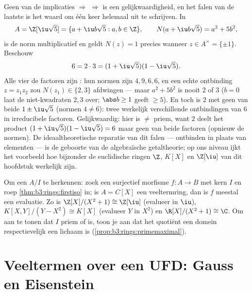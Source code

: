 \begin{example}
\label{ex:b3:rings:nonufd}
Geen van de implicaties  $\Rightarrow$
 $\Rightarrow$  is een gelijkwaardigheid, en
het falen van de laatste is het waard om één keer helemaal uit
te schrijven. In
\[
A = \Z[\iu\sqrt5] = \{a + \iu b\sqrt5 : a, b \in \Z\},
\qquad N(a + \iu b\sqrt5) = a^2 + 5b^2,
\]
is de norm multiplicatief en geldt $N(z) = 1$ precies wanneer
$z \in A^\times = \{\pm1\}$. Beschouw
\[
6 = 2 \cdot 3 = (1 + \iu\sqrt5)(1 - \iu\sqrt5).
\]
Alle vier de factoren zijn : hun normen zijn $4, 9,
6, 6$, en een echte ontbinding $z = z_1z_2$ zou $N(z_1) \in
\{2, 3\}$ afdwingen --- maar $a^2 + 5b^2$ is nooit $2$ of $3$
($b = 0$ laat de niet-kwadraten $2, 3$ over; $\abs b \geq 1$
geeft $\geq 5$). En toch is $2$ met geen van beide $1 \pm
\iu\sqrt5$  (normen $4 \neq 6$): twee werkelijk
verschillende ontbindingen van $6$ in irreducibele factoren.
Gelijkwaardig: hier is  $\neq$ priem, want $2$ deelt
het product $(1 + \iu\sqrt5)(1 - \iu\sqrt5) = 6$ maar geen van
beide factoren (opnieuw de normen). De ideaaltheoretische
reparatie van dit falen --- \emph{} ontbinden in plaats
van elementen --- is de geboorte van de algebraïsche
getaltheorie; op ons niveau ijkt het voorbeeld hoe bijzonder de
euclidische ringen $\Z$, $K[X]$ en $\Z[\iu]$ van dit hoofdstuk
werkelijk zijn.
\end{example}

\begin{method}\label{met:b3:rings:quotient}
Om een  $A/I$ te herkennen: zoek een surjectief
morfisme $f \colon A \to B$ met kern $I$ en roep
\cref{thm:b3:rings:firstiso} in; is $A = C[X]$ een veeltermring,
dan is $f$ meestal een evaluatie. Zo is $\Z[X]/(X^2+1) \cong
\Z[\iu]$ (evalueer in $\iu$), $K[X,Y]/(Y - X^2) \cong K[X]$
(evalueer $Y$ in $X^2$) en $\R[X]/(X^2+1) \cong \C$. Om aan te
tonen dat $I$ priem of  is, toon je aan dat het quotiënt
een domein respectievelijk een lichaam is
(\cref{prop:b3:rings:primemaximal}).
\end{method}

\section{Veeltermen over een UFD: Gauss en Eisenstein}


